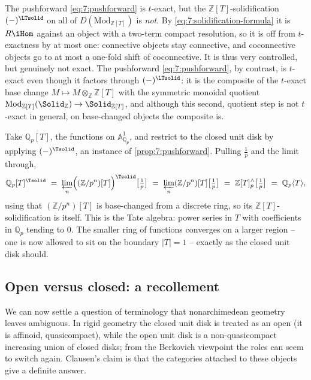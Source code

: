 \begin{remark}
\label{rmk:7:not-t-exact}
The pushforward \eqref{eq:7:pushforward} is $t$-exact, but the
$\mathbb{Z}[T]$-solidification $(-)^{\LTsolid}$ on all of
$D(\mathrm{Mod}_{\mathbb{Z}[T]})$ is \emph{not}. By
\eqref{eq:7:solidification-formula} it is $R\iHom$ against an object with a
two-term compact resolution, so it is off from $t$-exactness by at most one:
connective objects stay connective, and coconnective objects go to at most a
one-fold shift of coconnective. It is thus very controlled, but genuinely not
exact. The pushforward \eqref{eq:7:pushforward}, by contrast, is $t$-exact even
though it factors through $(-)^{\LTsolid}$: it is the composite of the
$t$-exact base change $M\mapsto M\otimes_{\mathbb{Z}}\mathbb{Z}[T]$ with the
symmetric monoidal quotient
$\mathrm{Mod}_{\mathbb{Z}[T]}(\Solid_{\mathbb{Z}})\to\Solid_{\mathbb{Z}[T]}$,
and although this second, quotient step is not $t$-exact in general, on
base-changed objects the composite is.
\end{remark}

\begin{example}
\label{ex:7:closed-disk-Qp}
Take $\mathbb{Q}_p[T]$, the functions on $\mathbb{A}^1_{\mathbb{Q}_p}$, and
restrict to the closed unit disk by applying $(-)^{\Tsolid}$, an instance of
\cref{prop:7:pushforward}. Pulling $\tfrac1p$ and the limit through,
\begin{equation*}
\mathbb{Q}_p[T]^{\Tsolid}\ =\ \varprojlim_{n}\Bigl((\mathbb{Z}/p^n)[T]
\Bigr)^{\Tsolid}\bigl[\tfrac1p\bigr]\ =\ \varprojlim_{n}(\mathbb{Z}/p^n)[T]
\bigl[\tfrac1p\bigr]\ =\ \mathbb{Z}[T]^{\wedge}_{p}\bigl[\tfrac1p\bigr]
\ =\ \mathbb{Q}_p\langle T\rangle,
\end{equation*}
using that $(\mathbb{Z}/p^n)[T]$ is base-changed from a discrete ring, so its
$\mathbb{Z}[T]$-solidification is itself. This is the Tate algebra: power series
in $T$ with coefficients in $\mathbb{Q}_p$ tending to $0$. The smaller ring of
functions converges on a larger region -- one is now allowed to sit on the
boundary $|T|=1$ -- exactly as the closed unit disk should.
\end{example}

\subsection{Open versus closed: a recollement}

We can now settle a question of terminology that nonarchimedean geometry
leaves ambiguous. In rigid geometry the closed unit disk is treated as an open
(it is affinoid, quasicompact), while the open unit disk is a non-quasicompact
increasing union of closed disks; from the Berkovich viewpoint the roles can
seem to switch again. Clausen's claim is that the categories attached to these
objects give a definite answer.

